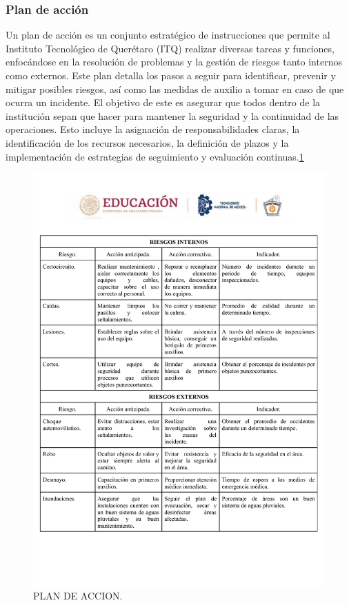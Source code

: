     \subsubsection{Plan de acción}
    Un plan de acción es un conjunto estratégico de instrucciones que permite al Instituto Tecnológico de Querétaro (ITQ) realizar diversas tareas y funciones, enfocándose en la resolución de problemas y la gestión de riesgos tanto internos como externos. Este plan detalla los pasos a seguir para identificar, prevenir y mitigar posibles riesgos, así como las medidas de auxilio a tomar en caso de que ocurra un incidente. El objetivo de este es asegurar que todos dentro de la institución sepan que hacer para mantener la seguridad y la continuidad de las operaciones. Esto incluye la asignación de responsabilidades claras, la identificación de los recursos necesarios, la definición de plazos y la implementación de estrategias de seguimiento y evaluación continuas.\ref{Plan de accion} 
    \begin{figure}
        \centering
    \includegraphics[trim = {0mm 30mm 0mm 0mm},clip,scale=0.3]{24/Img/plandeAccion.pdf}
        \caption{PLAN DE ACCION.}
        \label{Plan de accion}
    \end{figure}
